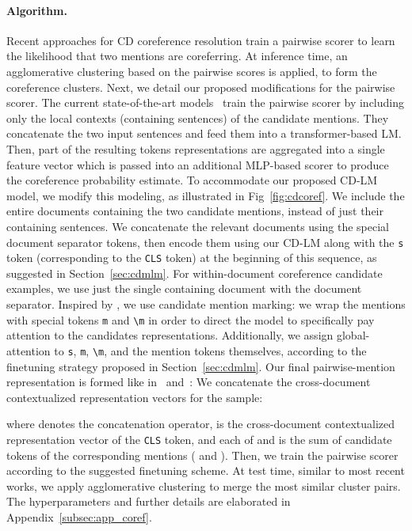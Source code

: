 \documentclass[11pt,a4paper]{article}
\begin{document}
\paragraph{Algorithm.} 
Recent approaches for CD coreference resolution train a pairwise scorer to learn the likelihood that two mentions are coreferring. At inference time, an agglomerative clustering based on the pairwise scores is applied, to form the coreference clusters. Next, we detail our proposed modifications for the pairwise scorer.
The current state-of-the-art models~\cite{zeng-etal-2020-event,yu2020paired} train the pairwise scorer by including only the local contexts (containing sentences) of the candidate mentions. They concatenate the two input sentences and feed them into a transformer-based LM. Then, part of the resulting tokens representations are aggregated into a single feature vector which is passed into an additional MLP-based scorer to produce the coreference probability estimate.
To accommodate our proposed CD-LM model, we modify this modeling, as illustrated in Fig~\ref{fig:cdcoref}. We include the entire documents containing the two candidate mentions, instead of just their containing sentences. We concatenate the relevant documents using the special document separator tokens, then encode them using our CD-LM along with the {\tt s} token (corresponding to the {\tt CLS} token) at the beginning of this sequence, as suggested in Section~\ref{sec:cdmlm}. For within-document coreference candidate examples, we use just the single containing document with the document separator. Inspired by \citet{yu2020paired}, we use candidate mention marking: we wrap the mentions with special tokens {\tt m} and {\tt \textbackslash m} in order to direct the model to specifically pay attention to the candidates representations. Additionally, we assign global-attention to {\tt s}, {\tt m}, {\tt \textbackslash m}, and the mention tokens themselves, according to the finetuning strategy proposed in Section~\ref{sec:cdmlm}. Our final pairwise-mention representation is formed like in~\citet{zeng-etal-2020-event} and~\citet{yu2020paired}: We concatenate the cross-document contextualized representation vectors for the  sample:

where  denotes the concatenation operator,  is the cross-document contextualized representation vector of the {\tt CLS} token, and each of  and  is the sum of candidate tokens of the corresponding mentions ( and ). Then, we train the pairwise scorer according to the suggested finetuning scheme. At test time, similar to most recent works, we apply agglomerative clustering to merge the most similar cluster pairs. The hyperparameters and further details are elaborated in Appendix~\ref{subsec:app_coref}.
\end{document}
